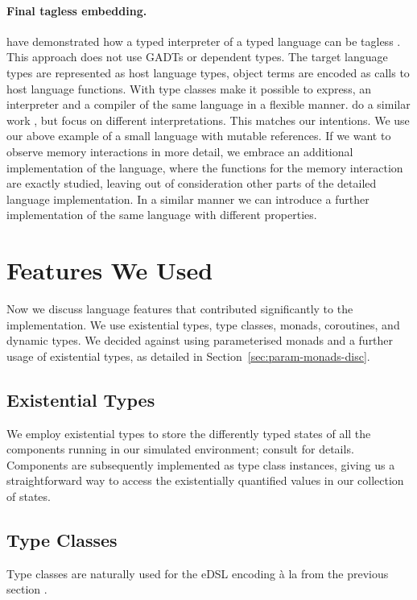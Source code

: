 \paragraph{Final tagless embedding.}
\citeauthor{final_tagless_embedding} have demonstrated how a typed interpreter of a typed language can be tagless \cite{final_tagless_embedding}.
This approach does not use GADTs or dependent types.
The target language types are represented as host language types, object terms are encoded as calls to host language functions. With type classes \citeauthor{final_tagless_embedding} make it possible to express, \eg an interpreter and a compiler of the same language in a flexible manner.
\citeauthor{Hofer:2008:PED:1449913.1449935} do a similar work \cite{Hofer:2008:PED:1449913.1449935}, but focus on different interpretations.
This matches our intentions.
We use our above example of a small language with mutable references.
If we want to observe memory interactions in more detail, we embrace an additional implementation of the language, where the functions for the memory interaction are exactly studied, leaving out of consideration other parts of the detailed language implementation.
In a similar manner we can introduce a further implementation of the same language with different properties.

\section{Features We Used}
\label{sec:impl-detail}
Now we discuss language features that contributed significantly to the
\soosim implementation. We use existential types, type classes,
monads, coroutines, and dynamic types. We decided against using
parameterised monads and a further usage of existential types, as
detailed in Section~\ref{sec:param-monads-disc}.
\subsection{Existential Types}
We employ existential types to store the differently typed states of
all the components running in our simulated environment; consult
\citeauthor{CambridgeJournals:1350264}
\cite{CambridgeJournals:1350264} for details.
Components are subsequently implemented as type class instances, giving us a straightforward way to access the existentially quantified values in our collection of states.

\subsection{Type Classes}
Type classes \cite{Hall:1996:TCH:227699.227700} are naturally used for
the eDSL encoding \`a la \citeauthor{final_tagless_embedding} from the
previous section \cite{final_tagless_embedding}.

